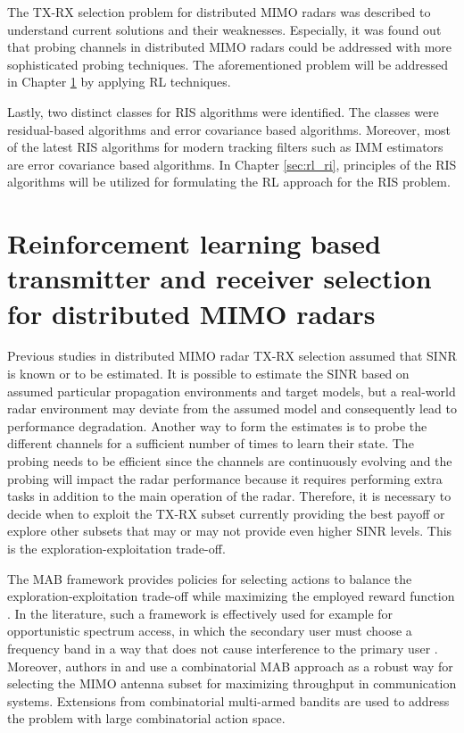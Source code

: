 \documentclass[english, 12pt, a4paper, elec, utf8, a-1b, online]{aaltothesis}
\begin{document}
The TX-RX selection problem for distributed MIMO radars was described to understand current solutions and their weaknesses.
Especially, it was found out that probing channels in distributed MIMO radars could be addressed with more sophisticated probing techniques.
The aforementioned problem will be addressed in Chapter \ref{sec:RL_TX_RX} by applying RL techniques.

Lastly, two distinct classes for RIS algorithms were identified. 
The classes were residual-based algorithms and error covariance based algorithms.
Moreover, most of the latest RIS algorithms for modern tracking filters such as IMM estimators are error covariance based algorithms.
In Chapter \ref{sec:rl_ri}, principles of the RIS algorithms will be utilized for formulating the RL approach for the RIS problem.



\newpage
\section{Reinforcement learning based transmitter and receiver selection for distributed MIMO radars}\label{sec:RL_TX_RX}

Previous studies in distributed MIMO radar TX-RX selection assumed that SINR is known or to be estimated.
It is possible to estimate the SINR based on assumed particular propagation environments and target models, but a real-world radar environment may deviate from the assumed model and consequently lead to performance degradation.
Another way to form the estimates is to probe the different channels for a sufficient number of times to learn their state.
The probing needs to be efficient since the channels are continuously evolving and the probing will impact the radar performance because it requires performing extra tasks in addition to the main operation of the radar.  Therefore, it is necessary to decide when to exploit the TX-RX subset currently providing the best payoff or explore other subsets that may or may not provide even higher SINR levels. 
This is the exploration-exploitation trade-off.

The MAB framework provides policies for selecting actions to balance the exploration-exploitation trade-off while maximizing the employed reward function \cite{Lattimore2019}.
In the literature, such a framework is effectively used for example for opportunistic spectrum access, in which the secondary user must choose a frequency band in a way that does not cause interference to the primary user \cite{Zhao2008}.
Moreover, authors in \cite{Mukherjee2012} and \cite{Kuai2019} use a combinatorial MAB approach as a robust way for selecting the MIMO antenna subset for maximizing throughput in communication systems.
Extensions from combinatorial multi-armed bandits are used to address the problem with large combinatorial action space.
\end{document}
